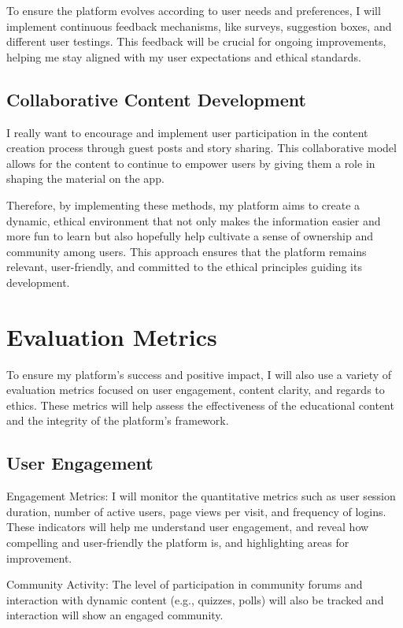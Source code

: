 \documentclass[12pt,twocolumn]{article}
\begin{document}
To ensure the platform evolves according to user needs and preferences, I will implement continuous feedback mechanisms, like surveys, suggestion boxes, and different user testings. This feedback will be crucial for ongoing improvements, helping me stay aligned with my user expectations and ethical standards.

\subsection{Collaborative Content Development}

I really want to encourage and implement user participation in the content creation process through guest posts and story sharing. This collaborative model allows for the content to continue to empower users by giving them a role in shaping the material on the app.

Therefore, by implementing these methods, my platform aims to create a dynamic, ethical environment that not only makes the information easier and more fun to learn but also hopefully help cultivate a sense of ownership and community among users. This approach ensures that the platform remains relevant, user-friendly, and committed to the ethical principles guiding its development.


\section{Evaluation Metrics}

To ensure my platform's success and positive impact, I will also use a variety of evaluation metrics focused on user engagement, content clarity, and regards to ethics. These metrics will help assess the effectiveness of the educational content and the integrity of the platform's framework.

\subsection{User Engagement}

Engagement Metrics: I will monitor the quantitative metrics such as user session duration, number of active users, page views per visit, and frequency of logins. These indicators will help me understand user engagement, and reveal how compelling and user-friendly the platform is, and highlighting areas for improvement.

Community Activity: The level of participation in community forums and interaction with dynamic content (e.g., quizzes, polls) will also be tracked and interaction will show an engaged community.
\end{document}
